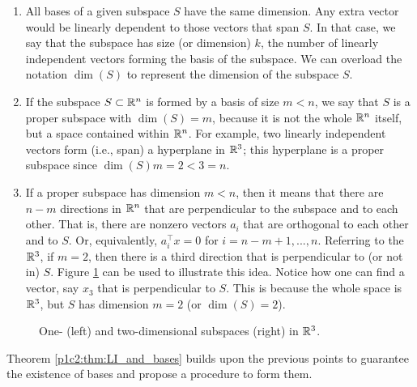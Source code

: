 \begin{enumerate}
	\item All bases of a given subspace $S$ have the same dimension. Any extra vector would be linearly dependent to those vectors that span $S$. In that case, we say that the subspace has size (or dimension) $k$, the number of linearly independent vectors forming the basis of the subspace. We can overload the notation $\dim(S)$ to represent the dimension of the subspace $S$.
	\item If the subspace $S \subset \mathbb{R}^n$ is formed by a basis of size $m < n$, we say that $S$ is a proper subspace with $\dim(S)=m$, because it is not the whole $\mathbb{R}^n$ itself, but a space contained within $\mathbb{R}^n$. For example, two linearly independent vectors form (i.e., span) a hyperplane in $\mathbb{R}^3$; this hyperplane is a proper subspace since $\dim(S)m=2 < 3=n$.
	\item If a proper subspace has dimension $m < n$, then it means that there are $n-m$ directions in $\mathbb{R}^n$ that are perpendicular to the subspace and to each other. That is, there are nonzero vectors $a_i$ that are orthogonal to each other and to $S$. Or, equivalently, $a_i^\top x = 0$ for $i = n-m + 1, ..., n$. Referring to the $\mathbb{R}^3$, if $m=2$, then there is a third direction that is perpendicular to (or not in) $S$. Figure \ref{p1c2:fig:proper_subpaces} can be used to illustrate this idea. Notice how one can find a vector, say $x_3$ that is perpendicular to $S$. This is because the whole space is $\mathbb{R}^3$, but $S$ has dimension $m=2$ (or $\dim(S)=2$). 
\end{enumerate}

\begin{figure}
	\centering
	\vspace{-12pt}
	\caption{One- (left) and two-dimensional subspaces (right) in $\mathbb{R}^3$.} \label{p1c2:fig:proper_subpaces}
\end{figure}

Theorem \ref{p1c2:thm:LI_and_bases} builds upon the previous points to guarantee the existence of bases and propose a procedure to form them.

